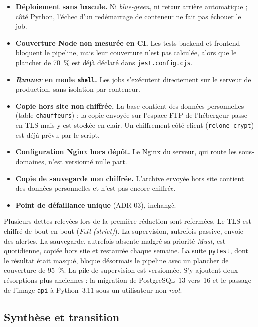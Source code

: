 \begin{itemize}
    \item \textbf{Déploiement sans bascule.} Ni \textit{blue-green}, ni retour arrière automatique ; côté Python, l'échec d'un redémarrage de conteneur ne fait pas échouer le job.
    \item \textbf{Couverture Node non mesurée en CI.} Les tests backend et frontend bloquent le pipeline, mais leur couverture n'est pas calculée, alors que le plancher de 70~\% est déjà déclaré dans \texttt{jest.config.cjs}.
    \item \textbf{\textit{Runner} en mode \texttt{shell}.} Les jobs s'exécutent directement sur le serveur de production, sans isolation par conteneur.
    \item \textbf{Copie hors site non chiffrée.} La base contient des données personnelles (table \texttt{chauffeurs}) ; la copie envoyée sur l'espace FTP de l'hébergeur passe en TLS mais y est stockée en clair. Un chiffrement côté client (\texttt{rclone crypt}) est déjà prévu par le script.
    \item \textbf{Configuration Nginx hors dépôt.} Le Nginx du serveur, qui route les sous-domaines, n'est versionné nulle part.
    \item \textbf{Copie de sauvegarde non chiffrée.} L'archive envoyée hors site contient des données personnelles et n'est pas encore chiffrée.
    \item \textbf{Point de défaillance unique} (ADR-03), inchangé.
\end{itemize}

Plusieurs dettes relevées lors de la première rédaction sont refermées. Le TLS est chiffré de bout en bout (\textit{Full (strict)}). La supervision, autrefois passive, envoie des alertes. La sauvegarde, autrefois absente malgré sa priorité \textit{Must}, est quotidienne, copiée hors site et restaurée chaque semaine. La suite \texttt{pytest}, dont le résultat était masqué, bloque désormais le pipeline avec un plancher de couverture de 95~\%. La pile de supervision est versionnée. S'y ajoutent deux résorptions plus anciennes : la migration de PostgreSQL~13 vers~16 et le passage de l'image \texttt{api} à Python~3.11 sous un utilisateur non-\textit{root}.

\subsection{Synthèse et transition}
\label{sec:devops_synthese_transition}

